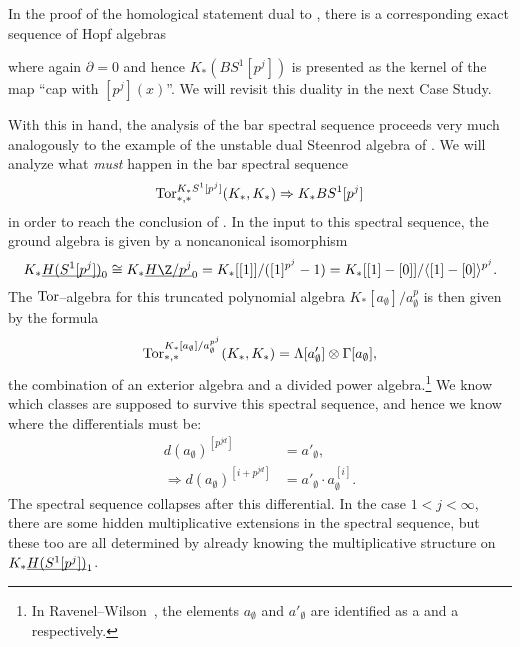 \begin{remark}\label{KHomologyOfClassifyingSpace}
In the proof of the homological statement dual to , there is a corresponding exact sequence of Hopf algebras
\begin{center}
\end{center}
where again $\partial = 0$ and hence $K_*(BS^1[p^j])$ is presented as the kernel of the map ``cap with $[p^j](x)$''.  We will revisit this duality in the next Case Study.
\end{remark}

With this in hand, the analysis of the bar spectral sequence proceeds very much analogously to the example of the unstable dual Steenrod algebra of .  We will analyze what \emph{must} happen in the bar spectral sequence \[\operatorname{Tor}^{K_* S^1[p^j]}_{*, *}(K_*, K_*) \Rightarrow K_* BS^1[p^j]\] in order to reach the conclusion of .  In the input to this spectral sequence, the ground algebra is given by a noncanonical isomorphism \[K_* \OS{H(S^1[p^j])}{0} \cong K_* \OS{H\Z/p^j}{0} = K_*[[1]] / ([1]^{p^j} - 1) = K_*[[1] - [0]] / \<[1] - [0]\>^{p^j}.\]  The $\operatorname{Tor}$--algebra for this truncated polynomial algebra $K_*[a_\emptyset] / a_\emptyset^{p}$ is then given by the formula \[\operatorname{Tor}^{K_*[a_\emptyset] / a_\emptyset^{p^j}}_{*, *}(K_*, K_*) = \Lambda[a'_\emptyset] \otimes \Gamma[a_\emptyset],\] the combination of an exterior algebra and a divided power algebra.\footnote{In Ravenel--Wilson~\cite[Lemma 6.6]{RavenelWilsonKthyOfEMSpaces}, the elements $a_\emptyset$ and $a'_\emptyset$ are identified as a  and a  respectively.}  We know which classes are supposed to survive this spectral sequence, and hence we know where the differentials must be:
\begin{align*}
d(a_\emptyset)^{[p^{jd}]} & = a'_\emptyset, \\
\Rightarrow d(a_\emptyset)^{[i + p^{jd}]} & = a'_\emptyset \cdot a_\emptyset^{[i]}.
\end{align*}
The spectral sequence collapses after this differential.  In the case $1 < j < \infty$, there are some hidden multiplicative extensions in the spectral sequence, but these too are all determined by already knowing the multiplicative structure on $K_* \underline{\smash{H(S^1[p^j])}}_{1}$.

